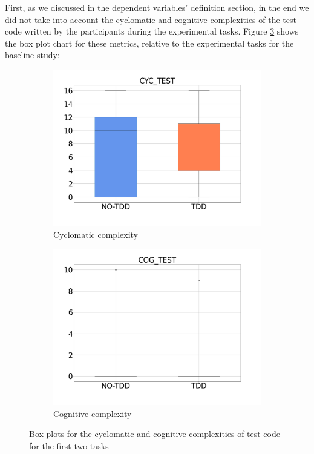 First, as we discussed in the dependent variables' definition section, in the end we did not take into account the cyclomatic and cognitive complexities of the test code written by the participants during the experimental tasks. 
Figure \ref{bp_task1_2_cyc_cog_test} shows the box plot chart for these metrics, relative to the experimental tasks for the baseline study:

\begin{figure}[htbp]
    \begin{subfigure}{0.5\textwidth}
        \includegraphics[width=\linewidth]{figures/box_plots/CYC_TEST.png}
        \caption{Cyclomatic complexity }
        \label{bp_task1_2_cyc_test}
    \end{subfigure}\hfil
    \begin{subfigure}{0.5\textwidth}
        \includegraphics[width=\linewidth]{figures/box_plots/COG_TEST.png}
        \caption{Cognitive complexity}
        \label{bp_task1_2_cog_test}
    \end{subfigure}
    \caption{Box plots for the cyclomatic and cognitive complexities of test code for the first two tasks}
    \label{bp_task1_2_cyc_cog_test}
\end{figure}

